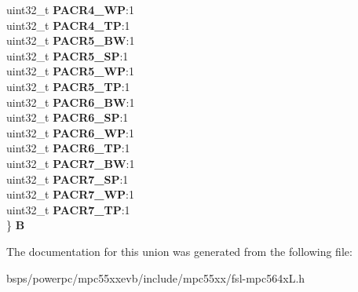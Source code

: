 \begin{DoxyCompactItemize}
\begin{tabbing}
\>uint32\_t {\bfseries PACR4\_WP}:1\\
\>uint32\_t {\bfseries PACR4\_TP}:1\\
\>uint32\_t {\bfseries PACR5\_BW}:1\\
\>uint32\_t {\bfseries PACR5\_SP}:1\\
\>uint32\_t {\bfseries PACR5\_WP}:1\\
\>uint32\_t {\bfseries PACR5\_TP}:1\\
\>uint32\_t {\bfseries PACR6\_BW}:1\\
\>uint32\_t {\bfseries PACR6\_SP}:1\\
\>uint32\_t {\bfseries PACR6\_WP}:1\\
\>uint32\_t {\bfseries PACR6\_TP}:1\\
\>uint32\_t {\bfseries PACR7\_BW}:1\\
\>uint32\_t {\bfseries PACR7\_SP}:1\\
\>uint32\_t {\bfseries PACR7\_WP}:1\\
\>uint32\_t {\bfseries PACR7\_TP}:1\\
\} {\bfseries B}\\

\end{tabbing}\end{DoxyCompactItemize}


The documentation for this union was generated from the following file\+:\begin{DoxyCompactItemize}
\item 
bsps/powerpc/mpc55xxevb/include/mpc55xx/fsl-\/mpc564x\+L.\+h\end{DoxyCompactItemize}
